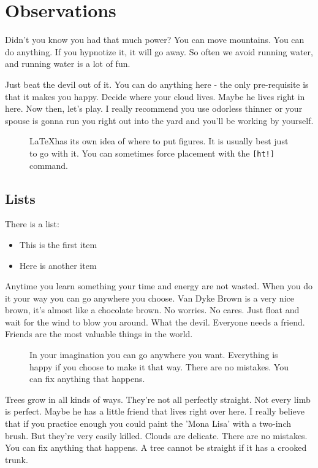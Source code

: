 \documentclass[twocolumn]{aastex701}
\begin{document}
\section{Observations}

Didn't you know you had that much power? You can move mountains. You can
do anything. If you hypnotize it, it will go away. So often we avoid
running water, and running water is a lot of fun.

Just beat the devil out of it. You can do anything here - the only
pre-requisite is that it makes you happy. Decide where your cloud lives.
Maybe he lives right in here. Now then, let's play. I really recommend
you use odorless thinner or your spouse is gonna run you right out into
the yard and you'll be working by yourself.

\begin{figure}%
\caption{\LaTeX has its own idea of where to put figures. It is usually best just to go with it. You can sometimes force placement with the \texttt{[ht!]} command.
\label{fig:general}}
\end{figure}


\subsection{Lists}

There is a list:

\begin{itemize}
    \item This is the first item
    \item Here is another item
\end{itemize}

Anytime you learn something your time and energy are not wasted. When
you do it your way you can go anywhere you choose. Van Dyke Brown is a
very nice brown, it's almost like a chocolate brown. No worries. No
cares. Just float and wait for the wind to blow you around. What the
devil. Everyone needs a friend. Friends are the most valuable things in
the world.

\begin{figure}[ht!]
\caption{In your imagination you can go anywhere you want. Everything is happy if you choose to make it that way. There are no mistakes. You can fix anything that happens.\label{fig:f2}}
\end{figure}

Trees grow in all kinds of ways. They're not all perfectly straight. Not
every limb is perfect. Maybe he has a little friend that lives right
over here. I really believe that if you practice enough you could paint
the 'Mona Lisa' with a two-inch brush. But they're very easily killed.
Clouds are delicate. There are no mistakes. You can fix anything that
happens. A tree cannot be straight if it has a crooked trunk.
\end{document}
